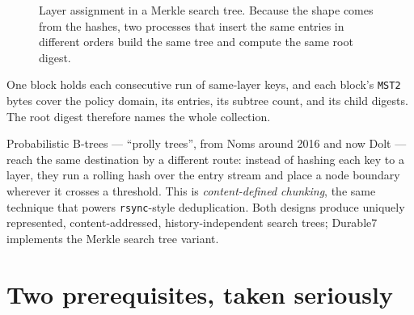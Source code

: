 \documentclass[11pt,twoside,openright]{book}
\newcommand{\code}[1]{\texorpdfstring{\textcolor{d7ink}{\texttt{#1}}}{#1}}
\newcommand{\term}[1]{\textit{#1}}
\begin{document}
\begin{figure}[htbp]
\centering
{}
\caption{Layer assignment in a Merkle search tree. Because the shape comes from
the hashes, two processes that insert the same entries in different orders build
the same tree and compute the same root digest.}
\label{fig:mst}
\end{figure}

One block holds each consecutive run of same-layer keys, and each block's
\code{MST2} bytes cover the policy domain, its entries, its subtree count, and
its child digests. The root digest therefore names the whole collection.

\begin{asidebox}
Probabilistic B-trees --- ``prolly trees'', from Noms around 2016 and now Dolt
--- reach the same destination by a different route: instead of hashing each key
to a layer, they run a rolling hash over the entry stream and place a node
boundary wherever it crosses a threshold. This is \term{content-defined
chunking}, the same technique that powers \code{rsync}-style deduplication.
Both designs produce uniquely represented, content-addressed, history-independent
search trees; Durable7 implements the Merkle search tree variant.
\end{asidebox}

\section{Two prerequisites, taken seriously}
\end{document}
